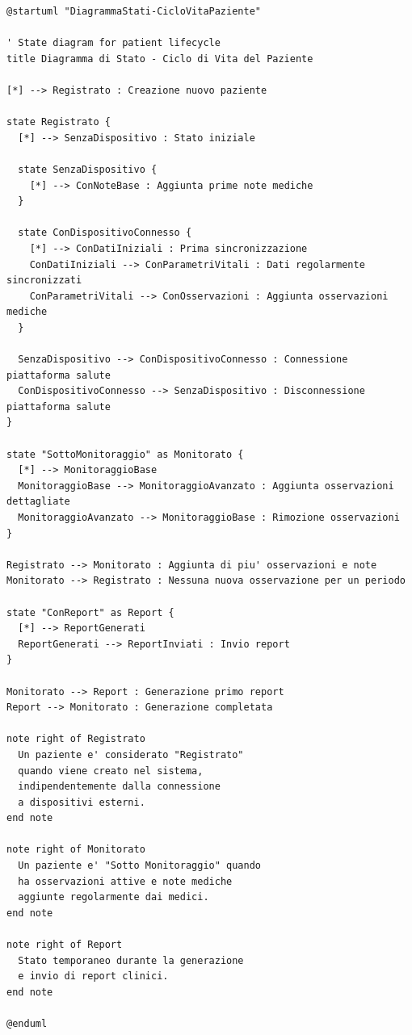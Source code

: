\documentclass[12pt,a4paper,oneside]{report}
\begin{document}
\begin{lstlisting}[basicstyle=\small\ttfamily, breaklines=true, caption={ciclo di vita del paziente}]
@startuml "DiagrammaStati-CicloVitaPaziente"

' State diagram for patient lifecycle
title Diagramma di Stato - Ciclo di Vita del Paziente

[*] --> Registrato : Creazione nuovo paziente

state Registrato {
  [*] --> SenzaDispositivo : Stato iniziale
  
  state SenzaDispositivo {
    [*] --> ConNoteBase : Aggiunta prime note mediche
  }
  
  state ConDispositivoConnesso {
    [*] --> ConDatiIniziali : Prima sincronizzazione
    ConDatiIniziali --> ConParametriVitali : Dati regolarmente sincronizzati
    ConParametriVitali --> ConOsservazioni : Aggiunta osservazioni mediche
  }
  
  SenzaDispositivo --> ConDispositivoConnesso : Connessione piattaforma salute
  ConDispositivoConnesso --> SenzaDispositivo : Disconnessione piattaforma salute
}

state "SottoMonitoraggio" as Monitorato {
  [*] --> MonitoraggioBase
  MonitoraggioBase --> MonitoraggioAvanzato : Aggiunta osservazioni dettagliate
  MonitoraggioAvanzato --> MonitoraggioBase : Rimozione osservazioni
}

Registrato --> Monitorato : Aggiunta di piu' osservazioni e note
Monitorato --> Registrato : Nessuna nuova osservazione per un periodo

state "ConReport" as Report {
  [*] --> ReportGenerati
  ReportGenerati --> ReportInviati : Invio report
}

Monitorato --> Report : Generazione primo report
Report --> Monitorato : Generazione completata

note right of Registrato
  Un paziente e' considerato "Registrato" 
  quando viene creato nel sistema,
  indipendentemente dalla connessione 
  a dispositivi esterni.
end note

note right of Monitorato
  Un paziente e' "Sotto Monitoraggio" quando 
  ha osservazioni attive e note mediche
  aggiunte regolarmente dai medici.
end note

note right of Report
  Stato temporaneo durante la generazione
  e invio di report clinici.
end note

@enduml

\end{lstlisting}
\end{document}
